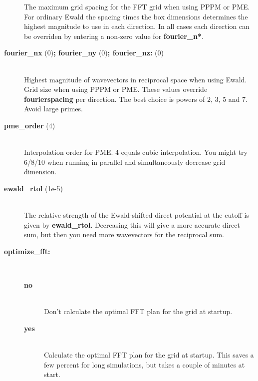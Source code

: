 \begin{description}
The maximum grid spacing for the FFT grid when using PPPM or PME.
For ordinary Ewald the spacing times the box dimensions determines the
highest magnitude to use in each direction. In all cases
each direction can be overriden by entering a non-zero value for
{\bf fourier\_n*}. 
\item[{\bf fourier\_nx }(0){\bf  ; fourier\_ny }(0){\bf  ; fourier\_nz: }(0)]\mbox{}\\
Highest magnitude of wavevectors in reciprocal space when using Ewald.
Grid size when using PPPM or PME. These values override
{\bf fourierspacing} per direction. The best choice is powers of
2, 3, 5 and 7. Avoid large primes.
\item[{\bf pme\_order }(4)]\mbox{}\\
Interpolation order for PME. 4 equals cubic interpolation. You might try
6/8/10 when running in parallel and simultaneously decrease grid dimension.
\item[{\bf ewald\_rtol }(1e-5)]\mbox{}\\
The relative strength of the Ewald-shifted direct potential at the cutoff
is given by {\bf ewald\_rtol}. Decreasing this will give a more accurate
direct sum, but then you need more wavevectors for the reciprocal sum.
\item[{\bf optimize\_fft:}]\mbox{}\\
\vspace{-2ex}\begin{description}
\item[{\bf no}]\mbox{}\\
Don't calculate the optimal FFT plan for the grid at startup.
\item[{\bf yes}]\mbox{}\\
Calculate the optimal FFT plan for the grid at startup. This saves a
few percent for long simulations, but takes a couple of minutes
at start.
\end{description}
\end{description}

